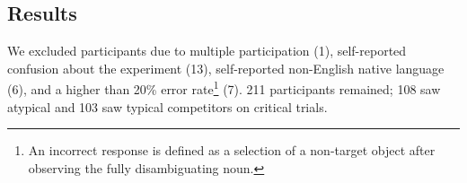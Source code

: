 \documentclass[10pt,letterpaper]{article}
\begin{document}



\subsection{Results}
We excluded participants due to multiple participation (1), self-reported confusion about the experiment (13), self-reported non-English native language (6), and a higher than 20\% error rate\footnote{An incorrect response is defined as a selection of a non-target object after observing the fully disambiguating noun.} (7).
211 participants remained; 108 saw atypical and 103 saw typical competitors on critical trials. 
\end{document}
